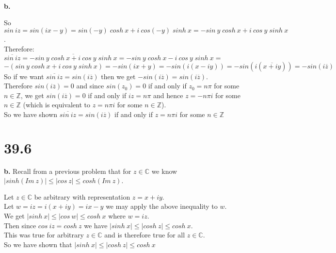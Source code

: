 \documentclass{article}
\begin{document}
{\Large\textbf{b.}}
\begin{center}
    \doublespacing
    So $sin\:iz = sin(ix - y) = sin(-y)\;cosh\:x + i\:cos(-y)\;sinh\:x = -sin\:y\;cosh\:x + i\:cos\:y\;sinh\:x$.
    \\Therefore:
    \\$\overline{sin\:iz} =\overline{-sin\:y\;cosh\:x + i\:cos\:y\;sinh\:x} = -sin\:y\;cosh\:x - i\:cos\:y\;sinh\:x =$
    \\$-(sin\:y\;cosh\:x + i\:cos\:y\;sinh\:x) = -sin(ix + y) = -sin(i(x - iy)) = -sin(i(\overline{x + iy})) = -sin(i\overline{z})$
    \\So if we want $\overline{sin\:iz} = sin(i\overline{z})$ then we get $-sin(i\overline{z}) = sin(i\overline{z})$.
    \\Therefore $sin(i\overline{z}) = 0$ and since $sin(z_0) = 0$ if and only if $z_0 = n\pi$ for some $n\in\mathbb{Z}$, we get $sin(i\overline{z}) = 0$ if and only if $iz = n\pi$ and hence $z = -n\pi i$ for some $n\in\mathbb{Z}$ (which is equivalent to $z = n\pi i$ for some $n\in\mathbb{Z}$).
    \\So we have shown $\overline{sin\:iz} = sin(i\overline{z})$ if and only if $z = n\pi i$ for some $n\in\mathbb{Z}$ \qedsymbol
\end{center}


\newpage
\section*{39.6}

{\Large\textbf{b.}} Recall from a previous problem that for $z\in\mathbb{C}$ we know $|sinh(Im\:z)|\leq |cos\:z|\leq cosh(Im\:z)$.
\begin{center}
    \doublespacing
    Let $z\in\mathbb{C}$ be arbitrary with representation $z = x + iy$.
    \\Let $w = iz = i(x + iy) = ix - y$ we may apply the above inequality to $w$.
    \\We get $|sinh\:x|\leq |cos\:w|\leq cosh\:x$ where $w = iz$.
    \\Then since $cos\:iz = cosh\:z$ we have $|sinh\:x|\leq |cosh\:z|\leq cosh\:x$.
    \\This was true for arbitrary $z\in\mathbb{C}$ and is therefore true for all $z\in\mathbb{C}$.
    \\So we have shown that $|sinh\:x|\leq |cosh\:z|\leq cosh\:x$ \qedsymbol
\end{center}
\end{document}
